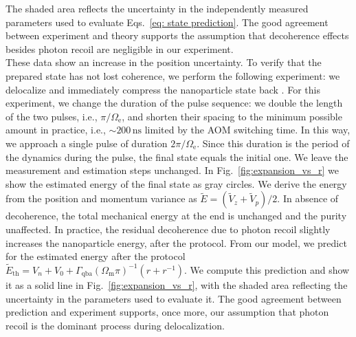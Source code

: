 \documentclass[aps,amssymb,amsmath,prl,superscriptaddress,reprint,noshowpacs]{revtex4-1}
\newcommand{\Om}{\Omega_\mathrm{m}}
\newcommand{\Oe}{\Omega_\mathrm{e}}
\newcommand{\Gqba}{\Gamma_\mathrm{qba}}
\begin{document}
%
The shaded area reflects the uncertainty in the independently measured parameters used to evaluate Eqs.~\eqref{eq: state prediction}.
%
The good agreement between experiment and theory supports the assumption that decoherence effects besides photon recoil are negligible in our experiment.
\\
These data show an increase in the position uncertainty. 
%
To verify that the prepared state has not lost coherence,  we perform the following experiment: we delocalize and immediately compress the nanoparticle state back \cite{weiss_large_2021}.
%
For this experiment, we change the duration of the pulse sequence: we double the length of the two pulses, i.e., $\pi/\Oe$, and shorten their spacing to the minimum possible amount in practice, i.e., $\sim200\,\mathrm{ns}$ limited by the AOM switching time.
%
In this way, we approach a single pulse of duration $2\pi/\Oe$.
%
Since this duration is the period of the dynamics during the pulse, the final state equals the initial one.
%
We leave the measurement and estimation steps unchanged.
%
In Fig.~\ref{fig:expansion_vs_r} we show the estimated energy of the final state as gray circles.
%
We derive the energy from the position and momentum variance as $\widetilde{E}=(\widetilde{V}_z+\widetilde{V}_p)/2$.
%
In absence of decoherence, the total mechanical energy at the end is unchanged and the purity unaffected.
%
In practice, the residual decoherence due to photon recoil slightly increases the nanoparticle energy, after the protocol.
%
From our model, we predict for the estimated energy after the protocol $\widetilde{E}_\mathrm{th}=V_n+V_0+\Gqba(\Om \pi)^{-1} \left(r+r^{-1}\right)$.
%
We compute this prediction and show it as a solid line in Fig.~\ref{fig:expansion_vs_r}, with the shaded area reflecting the uncertainty in the parameters used to evaluate it.
%
The good agreement between prediction and experiment supports, once more, our assumption that photon recoil is the dominant process during delocalization.
\end{document}
